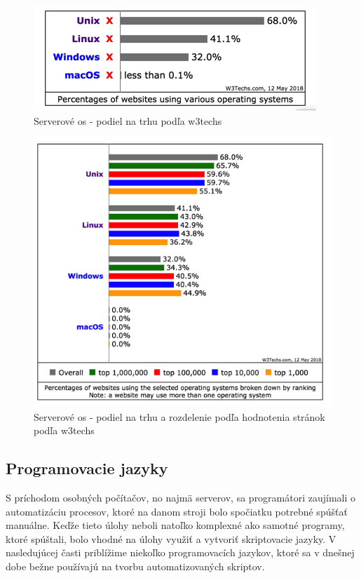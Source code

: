 \begin{figure}[!htbp]
	\centering
	\includegraphics[scale=0.4]{img/usg_server.png}
	\caption{Serverové \acrshort{os} - podiel na trhu podľa w3techs\cite{pop}}
	\label{fig:test}
	
\end{figure}
\begin{figure}[!htbp]
	\centering
	\includegraphics[scale=0.4]{img/usage_grou_by_os_sites.png}
	\caption{Serverové \acrshort{os} - podiel na trhu a rozdelenie podľa hodnotenia stránok podľa w3techs\cite{pop}}
	\label{fig:test}
	
\end{figure}

\subsection{Programovacie jazyky}
\indent S príchodom osobných počítačov, no najmä serverov, sa programátori zaujímali o automatizáciu procesov, ktoré na danom stroji bolo spočiatku potrebné spúšťať manuálne. Keďže tieto úlohy neboli natoľko komplexné ako samotné programy, ktoré spúštali, bolo vhodné na úlohy využiť a vytvoriť skriptovacie jazyky. V nasledujúcej časti priblížime niekoľko programovacích jazykov, ktoré sa v dnešnej dobe bežne používajú na tvorbu automatizovaných skriptov.

